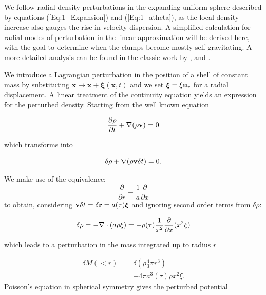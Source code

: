 We follow radial density perturbations in the expanding uniform sphere described by equations (\ref{Eq:1_Expansion}) and (\ref{Eq:1_atheta}), as the local density increase also gauges the rise in velocity dispersion. A simplified calculation for radial modes of perturbation in the linear approximation will be derived here, with the goal to determine when the clumps become mostly self-gravitating. A more detailed analysis can be found in the classic work by \cite{Friedman1978}, \cite{Peebles1980} and \cite{Aarseth1988} .

We introduce a Lagrangian perturbation in the position of a shell of constant mass by substituting $\mathbf{x} \rightarrow \mathbf{x} + \boldsymbol\xi(\mathbf{x},t)$ and we set $\boldsymbol\xi = \xi \bold{u_r}$ for a radial displacement. A linear treatment of the continuity equation yields an expression for the perturbed density. Starting from the well known equation

\begin{equation}
\frac{\partial \rho}{\partial t} + \nabla(\rho \bold{v}) = 0 
\end{equation}

which transforms into

\begin{equation}
\delta \rho + \nabla (\rho \bold{v} \delta t) = 0.
\end{equation}

We make use of the equivalence:
\begin{equation}
\label{Eq:1_derivequiv}
\frac{\partial}{\partial r} \equiv \frac{1}{a} \frac{\partial}{\partial x}
\end{equation}
to obtain, considering $ \bold{v} \delta t = \delta \bold{r} = a(\tau) \boldsymbol\xi$ and ignoring second order terms from $\delta \rho$:

\begin{equation} 
\label{Eq:1_DeltaRho} 
\delta\rho = - \mathbf{\nabla}\cdot (a\rho\mathbf{\xi}) =  - \rho(\tau) \frac{1}{x^2}\frac{\partial}{\partial x} ( x^2\xi ) 
\end{equation}

which leads to a perturbation in  the mass integrated up to  radius $r$ 

\begin{align}
\delta M(<r) &= \delta \left( \rho \frac{4}{3} \pi r^3 \right)\\
    &= - 4\pi a^3(\tau) \rho x^2 \xi . 
\end{align}
Poisson's equation in spherical symmetry gives the perturbed potential 

